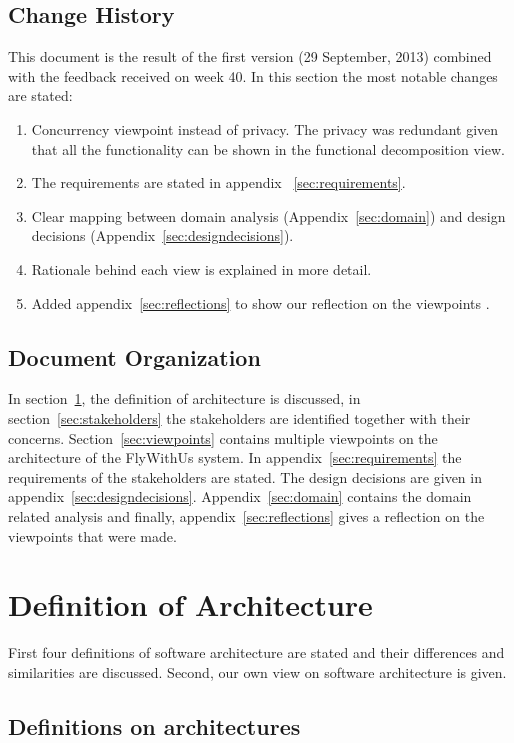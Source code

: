 \documentclass{article}
\begin{document}
\subsection{Change History}
This document is the result of the first version (29 September, 2013) combined with the feedback received on week 40. In this section the most notable changes are stated:
\begin{enumerate}
\item Concurrency viewpoint instead of privacy. The privacy was redundant given that all the functionality can be shown in the functional decomposition view. 
\item The requirements are stated in appendix ~\ref{sec:requirements}.
\item Clear mapping between domain analysis (Appendix~\ref{sec:domain}) and design decisions (Appendix~\ref{sec:designdecisions}).
\item Rationale behind each view is explained in more detail.
\item Added appendix~\ref{sec:reflections} to show our reflection on the viewpoints .
\end{enumerate}

\subsection{Document Organization}
In  section~\ref{sec:definition}, the definition of architecture is discussed, in  section~\ref{sec:stakeholders} the stakeholders are identified together with their concerns. Section~\ref{sec:viewpoints} contains multiple viewpoints on the architecture of the FlyWithUs system. In appendix~\ref{sec:requirements} the requirements of the stakeholders are stated. The design decisions are given in appendix~\ref{sec:designdecisions}. Appendix~\ref{sec:domain} contains the domain related analysis and finally, appendix~\ref{sec:reflections} gives a reflection on the viewpoints that were made. 

\section{Definition of Architecture}
\label{sec:definition}
First four definitions of software architecture are stated and their differences
and similarities are discussed. Second, our own view on software architecture is
given.
\subsection{Definitions on architectures}
\end{document}
